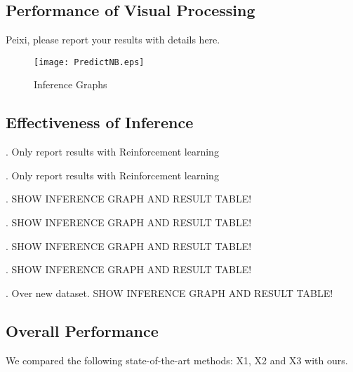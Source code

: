 \subsection{Performance of Visual Processing}

{\color{red} Peixi, please report your results with details here.}



\begin{figure}[tb!]
\centering
\texttt{[image: PredictNB.eps]}
\vspace{-2ex}
\caption{Inference Graphs}
\vspace{-2ex}
\label{fig:inferG}
\end{figure}

\subsection{Effectiveness of Inference} 

. Only report results with Reinforcement learning 

. Only report results with Reinforcement learning 

. {\color{red} SHOW INFERENCE GRAPH AND RESULT TABLE!}

. {\color{red} SHOW INFERENCE GRAPH AND RESULT TABLE!}

. {\color{red} SHOW INFERENCE GRAPH AND RESULT TABLE!}

. {\color{red} SHOW INFERENCE GRAPH AND RESULT TABLE!}

. {\color{red} Over new dataset. SHOW INFERENCE GRAPH AND RESULT TABLE!}

\subsection{Overall Performance}
\label{sec-overall-performance}

We compared the following state-of-the-art methods: X1, X2 and X3 with ours. 
